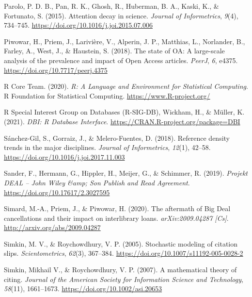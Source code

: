 \documentclass[
]{article}
\newlength{\cslhangindent}
\newlength{\cslentryspacingunit} %
\newenvironment{CSLReferences}[2] %
 {%
  \setlength{\parindent}{0pt}
  \ifodd #1
  \let\oldpar\par
  \def\par{\hangindent=\cslhangindent\oldpar}
  \fi
  \setlength{\parskip}{#2\cslentryspacingunit}
 }%
 {}
\begin{document}
\begin{CSLReferences}{1}{0}
\leavevmode{}%
Parolo, P. D. B., Pan, R. K., Ghosh, R., Huberman, B. A., Kaski, K., \& Fortunato, S. (2015). Attention decay in science. \emph{Journal of Informetrics}, \emph{9}(4), 734--745. \url{https://doi.org/10.1016/j.joi.2015.07.006}

\leavevmode{}%
Piwowar, H., Priem, J., Larivière, V., Alperin, J. P., Matthias, L., Norlander, B., Farley, A., West, J., \& Haustein, S. (2018). The state of {OA}: A large-scale analysis of the prevalence and impact of {Open} {Access} articles. \emph{PeerJ}, \emph{6}, e4375. \url{https://doi.org/10.7717/peerj.4375}

\leavevmode{}%
R Core Team. (2020). \emph{R: {A} {Language} and {Environment} for {Statistical} {Computing}}. R Foundation for Statistical Computing. \url{https://www.R-project.org/}

\leavevmode{}%
R Special Interest Group on Databases (R-SIG-DB), Wickham, H., \& Müller, K. (2021). \emph{{DBI}: {R} {Database} {Interface}}. \url{https://CRAN.R-project.org/package=DBI}

\leavevmode{}%
Sánchez-Gil, S., Gorraiz, J., \& Melero-Fuentes, D. (2018). Reference density trends in the major disciplines. \emph{Journal of Informetrics}, \emph{12}(1), 42--58. \url{https://doi.org/10.1016/j.joi.2017.11.003}

\leavevmode{}%
Sander, F., Hermann, G., Hippler, H., Meijer, G., \& Schimmer, R. (2019). \emph{Projekt {DEAL} -- {John} {Wiley} \&amp; {Son} {Publish} and {Read} {Agreement}}. \url{https://doi.org/10.17617/2.3027595}

\leavevmode{}%
Simard, M.-A., Priem, J., \& Piwowar, H. (2020). The aftermath of {Big} {Deal} cancellations and their impact on interlibrary loans. \emph{arXiv:2009.04287 {[}Cs{]}}. \url{http://arxiv.org/abs/2009.04287}

\leavevmode{}%
Simkin, M. V., \& Roychowdhury, V. P. (2005). Stochastic modeling of citation slips. \emph{Scientometrics}, \emph{62}(3), 367--384. \url{https://doi.org/10.1007/s11192-005-0028-2}

\leavevmode{}%
Simkin, Mikhail V., \& Roychowdhury, V. P. (2007). A mathematical theory of citing. \emph{Journal of the American Society for Information Science and Technology}, \emph{58}(11), 1661--1673. \url{https://doi.org/10.1002/asi.20653}


\end{CSLReferences}
\end{document}
